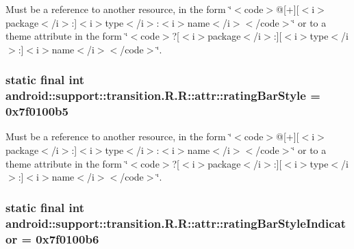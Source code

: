 Must be a reference to another resource, in the form \char`\"{}$<$code$>$@\mbox{[}+\mbox{]}\mbox{[}$<$i$>$package$<$/i$>$:\mbox{]}$<$i$>$type$<$/i$>$:$<$i$>$name$<$/i$>$$<$/code$>$\char`\"{} or to a theme attribute in the form \char`\"{}$<$code$>$?\mbox{[}$<$i$>$package$<$/i$>$:\mbox{]}\mbox{[}$<$i$>$type$<$/i$>$:\mbox{]}$<$i$>$name$<$/i$>$$<$/code$>$\char`\"{}. \hypertarget{classandroid_1_1support_1_1transition_1_1_r_1_1attr_7170f3c63e176db2ccf9f5f8b10f4c10}{
\subsubsection[{ratingBarStyle}]{\setlength{\rightskip}{0pt plus 5cm}static final int android::support::transition.R.R::attr::ratingBarStyle = 0x7f0100b5}}
\label{classandroid_1_1support_1_1transition_1_1_r_1_1attr_7170f3c63e176db2ccf9f5f8b10f4c10}


Must be a reference to another resource, in the form \char`\"{}$<$code$>$@\mbox{[}+\mbox{]}\mbox{[}$<$i$>$package$<$/i$>$:\mbox{]}$<$i$>$type$<$/i$>$:$<$i$>$name$<$/i$>$$<$/code$>$\char`\"{} or to a theme attribute in the form \char`\"{}$<$code$>$?\mbox{[}$<$i$>$package$<$/i$>$:\mbox{]}\mbox{[}$<$i$>$type$<$/i$>$:\mbox{]}$<$i$>$name$<$/i$>$$<$/code$>$\char`\"{}. \hypertarget{classandroid_1_1support_1_1transition_1_1_r_1_1attr_cbb2aab9423ad494ca0806d215dfb47d}{
\subsubsection[{ratingBarStyleIndicator}]{\setlength{\rightskip}{0pt plus 5cm}static final int android::support::transition.R.R::attr::ratingBarStyleIndicator = 0x7f0100b6}}
\label{classandroid_1_1support_1_1transition_1_1_r_1_1attr_cbb2aab9423ad494ca0806d215dfb47d}


